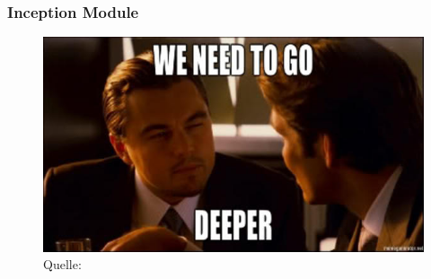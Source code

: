 \documentclass{beamer}
\begin{document}
\begin{frame}
	\frametitle{Inception Module}
	\begin{figure}
		\includegraphics[width=0.8\linewidth]{images/inception_meme.jpg}\\
		\hspace*{0pt}\hbox{\scriptsize Quelle:}
		\label{fig:inception_meme}
	\end{figure}
	
\end{frame}
\end{document}
